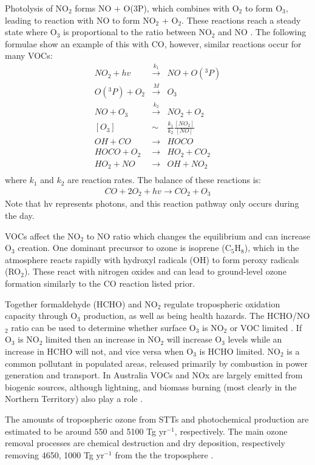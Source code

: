 Photolysis of NO$_2$ forms NO + O(3P), which combines with O$_2$ to form O$_3$, leading to reaction with NO to form NO$_2$ + O$_2$.
These reactions reach a steady state where O$_3$ is proportional to the ratio between NO$_2$ and NO \cite{Sillman_2002}.
The following formulae show an example of this with CO, however, similar reactions occur for many VOCs:
\begin{eqnarray*}
NO_2 + hv &\overset{k_1}{\rightarrow}& NO + O({}^3 P) \\
O({}^3 P) + O_2 &\overset{M}{\rightarrow}& O_3 \\
NO + O_3 &\overset{k_2}{\rightarrow}& NO_2 + O_2 \\
\left[O_3\right] &\sim& \frac{k_1}{k_2} \frac{\left[NO_2\right]}{\left[NO\right]} \\
OH + CO &{\rightarrow}& HOCO \\
HOCO + O_2 &{\rightarrow}& HO_2 + CO_2 \\
HO_2 + NO &{\rightarrow}& OH + NO_2 \\
\end{eqnarray*}
where $k_1$ and $k_2$ are reaction rates.
The balance of these reactions is:
\begin{eqnarray*} CO + 2O_2 + hv {\rightarrow} CO_2 + O_3 \end{eqnarray*}
Note that hv represents photons, and this reaction pathway only occurs during the day.

VOCs affect the NO$_2$ to NO ratio which changes the equilibrium and can increase O$_3$ creation.
One dominant precursor to ozone is isoprene (C$_5$H$_8$), which in the atmosphere reacts rapidly with hydroxyl radicals (OH) to form peroxy radicals (RO$_2$).
These react with nitrogen oxides and can lead to ground-level ozone formation similarly to the CO reaction listed prior.

Together formaldehyde (HCHO) and NO$_2$ regulate tropospheric oxidation capacity through O$_3$ production, as well as being health hazards.
The HCHO/NO$_2$ ratio can be used to determine whether surface O$_3$ is NO$_2$ or VOC limited \cite{Mahajan_2015}.
If O$_3$ is NO$_2$ limited then an increase in NO$_2$ will increase O$_3$ levels while an increase in HCHO will not, and vice versa when O$_3$ is HCHO limited.
NO$_2$ is a common pollutant in populated areas, released primarily by combustion in power generation and transport. 
In Australia VOCs and NOx are largely emitted from biogenic sources, although lightning, and biomass burning (most clearly in the Northern Territory) also play a role \cite{Guenther_2006, VanDerA_2008}.

The amounts of tropospheric ozone from STTs and photochemical production are estimated to be around 550 and 5100 Tg yr$^{-1}$, respectively. 
The main ozone removal processes are chemical destruction and dry deposition, respectively removing 4650, 1000 Tg yr$^{-1}$ from the the troposphere \cite{Stevenson_2006}.
